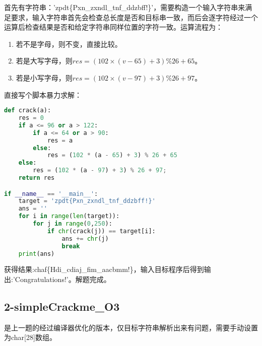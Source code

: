 首先有字符串：'zpdt\{Pxn\_zxndl\_tnf\_ddzbff!\}'，需要构造一个输入字符串来满足要求，输入字符串首先会检查总长度是否和目标串一致，而后会逐字符经过一个运算后检查结果是否和给定字符串同样位置的字符一致。运算流程为：
\begin{enumerate}
    \item 若不是字母，则不变，直接比较。
    \item 若是大写字母，则$res = (102 \times (v - 65) + 3) \%26 + 65$。
    \item 若是小写字母，则$res = (102 \times (v - 97) + 3) \%26 + 97$。
\end{enumerate}
直接写个脚本暴力求解：
\begin{lstlisting}[language=python]
def crack(a):
    res = 0
    if a <= 96 or a > 122:
        if a <= 64 or a > 90:
            res = a
        else:
            res = (102 * (a - 65) + 3) % 26 + 65
    else:
        res = (102 * (a - 97) + 3) % 26 + 97;
    return res

if __name__ == '__main__':
    target = 'zpdt{Pxn_zxndl_tnf_ddzbff!}'
    ans = ''
    for i in range(len(target)):
        for j in range(0,250):
            if chr(crack(j)) == target[i]:
                ans += chr(j)
                break
    print(ans)
\end{lstlisting}
获得结果:chaf\{Hdi\_cdiaj\_fim\_aacbmm!\}，输入目标程序后得到输出:'Congratulations!'。解题完成。


\subsection{2-simpleCrackme\_O3}
是上一题的经过编译器优化的版本，仅目标字符串解析出来有问题，需要手动设置为char[28]数组。

